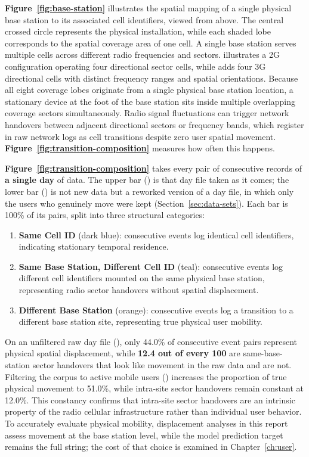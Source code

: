 \textbf{Figure~\ref{fig:base-station}} illustrates the spatial mapping of a single physical base station to its associated cell identifiers, viewed from above. The central crossed circle represents the physical installation, while each shaded lobe corresponds to the spatial coverage area of one cell. A single base station serves multiple cells across different radio frequencies and sectors. \textbf{} illustrates a 2G configuration operating four directional sector cells, while \textbf{} adds four 3G directional cells with distinct frequency ranges and spatial orientations. Because all eight coverage lobes originate from a single physical base station location, a stationary device at the foot of the base station sits inside multiple overlapping coverage sectors simultaneously. Radio signal fluctuations can trigger network handovers between adjacent directional sectors or frequency bands, which register in raw network logs as cell transitions despite zero user spatial movement. \textbf{Figure~\ref{fig:transition-composition}} measures how often this happens.





\textbf{Figure~\ref{fig:transition-composition}} takes every pair of consecutive records of \textbf{a single day} of data. The upper bar (\Draw{}) is that day file taken as it comes; the lower bar (\Dmob{}) is not new data but a reworked version of a day file, in which only the users who genuinely move were kept (Section~\ref{sec:data-sets}). Each bar is 100\% of its pairs, split into three structural categories:
\begin{enumerate}
  \item \textbf{Same Cell ID} (dark blue): consecutive events log identical cell identifiers, indicating stationary temporal residence.
  \item \textbf{Same Base Station, Different Cell ID} (teal): consecutive events log different cell identifiers mounted on the same physical base station, representing radio sector handovers without spatial displacement.
  \item \textbf{Different Base Station} (orange): consecutive events log a transition to a different base station site, representing true physical user mobility.
\end{enumerate}
On an unfiltered raw day file (\Draw{}), only 44.0\% of consecutive event pairs represent physical spatial displacement, while \textbf{12.4 out of every 100} are same-base-station sector handovers that look like movement in the raw data and are not. Filtering the corpus to active mobile users (\Dmob{}) increases the proportion of true physical movement to 51.0\%, while intra-site sector handovers remain constant at 12.0\%. This constancy confirms that intra-site sector handovers are an intrinsic property of the radio cellular infrastructure rather than individual user behavior. To accurately evaluate physical mobility, displacement analyses in this report assess movement at the base station level, while the model prediction target remains the full  string; the cost of that choice is examined in Chapter~\ref{ch:user}.

